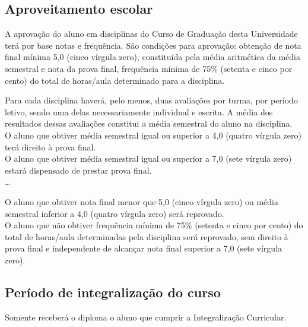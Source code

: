 \subsection{Aproveitamento escolar}
\begin{itquotation}
	\setcounter{artigo}{94}
	\artigo A aprovação do aluno em disciplinas do Curso de Graduação desta Universidade terá por base notas e frequência. São condições para aprovação: obtenção de nota final mínima 5,0 (cinco vírgula zero), constituída pela média aritmética da média semestral e nota da prova final, frequência mínima de 75\% (setenta e cinco por cento) do total de horas/aula determinado para a disciplina.

	\begin{paragrafos}
		\paragrafo Para cada disciplina haverá, pelo menos, duas avaliações por turma, por período letivo, sendo uma delas necessariamente individual e escrita. A média dos resultados dessas avaliações constitui a média semestral do aluno na disciplina.\\
		\paragrafo O aluno que obtiver média semestral igual ou superior a 4,0 (quatro vírgula zero) terá direito à prova final.\\
		\paragrafo O aluno que obtiver média semestral igual ou superior a 7,0 (sete vírgula zero) estará dispensado de prestar prova final.\\
		\ldots

		\setcounter{paragrafo}{6}
		\paragrafo  O aluno que obtiver nota final menor que 5,0 (cinco vírgula zero) ou média semestral inferior a 4,0 (quatro vírgula zero) será reprovado.\\
		\paragrafo O aluno que não obtiver frequência mínima de 75\% (setenta e cinco por cento) do total de horas/aula determinadas pela disciplina será reprovado, sem direito à prova final e independente de alcançar nota final superior a 7,0 (sete vírgula zero).\\
	\end{paragrafos}

\end{itquotation}
\subsection{Período de integralização do curso}
\setcounter{artigo}{98}
\begin{itquotation}
	\artigo Somente receberá o diploma o aluno que cumprir a Integralização Curricular.
\end{itquotation}

